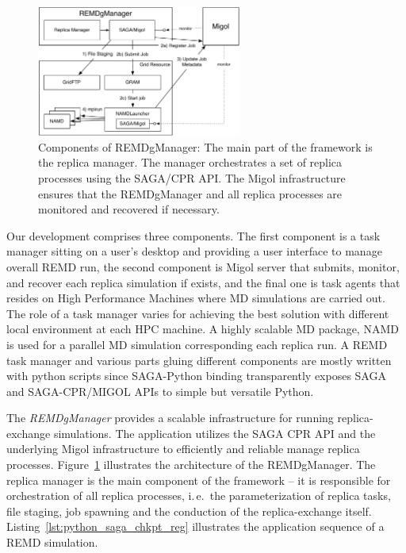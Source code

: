 \documentclass[times, 10pt, twocolumn]{article}
\begin{document}
\begin{figure}[htbp]
      \centering
          \includegraphics[width=0.6\textwidth]{REMDgManager-architecture.pdf}
          \caption{Components of REMDgManager: The main part of the
            framework is the replica manager. The manager orchestrates
            a set of replica processes using the SAGA/CPR API. The
            Migol infrastructure ensures that the REMDgManager and all
            replica processes are monitored and recovered if
            necessary.}
      \label{fig:REMDgManager-architecture}
\end{figure}


Our development comprises three components. The first component is a
task manager sitting on a user's desktop and providing a user
interface to manage overall REMD run, the second component is Migol
server that submits, monitor, and recover each replica simulation if
exists, and the final one is task agents that resides on High
Performance Machines where MD simulations are carried out.  The role
of a task manager varies for achieving the best solution with
different local environment at each HPC machine.  A highly scalable MD
package, NAMD~\cite{Phillips:2005gd} is used for a parallel MD
simulation corresponding each replica run.  A REMD task manager and
various parts gluing different components are mostly written with
python scripts since SAGA-Python binding transparently exposes SAGA
and SAGA-CPR/MIGOL APIs to simple but versatile Python.

The \emph{REMDgManager} provides a scalable infrastructure for running
replica-exchange simulations.  The application utilizes the SAGA CPR
API and the underlying Migol infrastructure to efficiently and
reliable manage replica
processes. Figure~\ref{fig:REMDgManager-architecture} illustrates the
architecture of the REMDgManager. The replica manager is the main
component of the framework -- it is responsible for orchestration of
all replica processes, i.\,e.\ the parameterization of replica tasks,
file staging, job spawning and the conduction of the replica-exchange
itself. Listing~\ref{lst:python_saga_chkpt_reg} illustrates the
application sequence of a REMD simulation.
 
\end{document}
